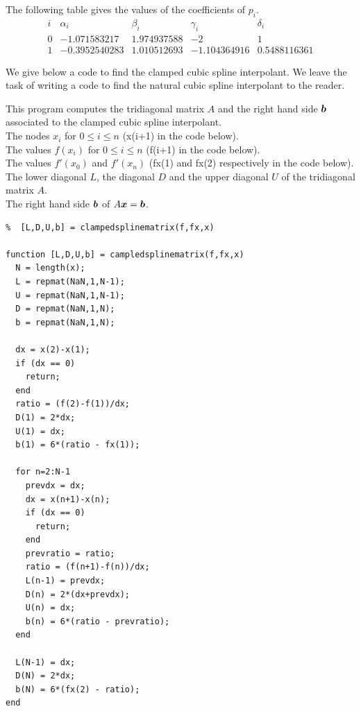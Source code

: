 \begin{egg}
The following table gives the values of the coefficients of
$p_i$.
\[
\begin{array}{c|cccc}
i & \alpha_i & \beta_i & \gamma_i & \delta_i \\
\hline
0 & -1.071583217 & 1.974937588 & -2 & 1 \\
1 & -0.3952540283 & 1.010512693 & -1.104364916 & 0.5488116361
\end{array}
\]
\label{egg_clamped}
\end{egg}

We give below a code to find the clamped cubic spline interpolant.
We leave the task of writing a code to find the natural cubic spline
interpolant to the reader.

\begin{code} \label{codeCCSI}
This program computes the tridiagonal matrix $A$ and the right hand
side $\bm{b}$ associated to the clamped cubic spline interpolant.\\
 The nodes $x_i$ for $0 \leq i \leq n$ (x(i+1) in the code
below).\\
The values $f(x_i)$ for $0 \leq i \leq n$ (f(i+1) in the code
below).\\
The values $f'(x_0)$ and $f'(x_n)$ (fx(1) and fx(2) respectively
in the code below).\\
 The lower diagonal $L$, the diagonal $D$ and the upper
diagonal $U$ of the tridiagonal matrix $A$.\\
The right hand side $\bm{b}$ of $A\bm{x} = \bm{b}$.
\small
\begin{verbatim}
%  [L,D,U,b] = clampedsplinematrix(f,fx,x)

function [L,D,U,b] = campledsplinematrix(f,fx,x)
  N = length(x);
  L = repmat(NaN,1,N-1);
  U = repmat(NaN,1,N-1);
  D = repmat(NaN,1,N);
  b = repmat(NaN,1,N);

  dx = x(2)-x(1);
  if (dx == 0)
    return;
  end
  ratio = (f(2)-f(1))/dx;
  D(1) = 2*dx;
  U(1) = dx;
  b(1) = 6*(ratio - fx(1));

  for n=2:N-1
    prevdx = dx;
    dx = x(n+1)-x(n);
    if (dx == 0)
      return;
    end
    prevratio = ratio;
    ratio = (f(n+1)-f(n))/dx;
    L(n-1) = prevdx;
    D(n) = 2*(dx+prevdx);
    U(n) = dx;
    b(n) = 6*(ratio - prevratio);
  end

  L(N-1) = dx;
  D(N) = 2*dx;
  b(N) = 6*(fx(2) - ratio);
end
\end{verbatim}
\end{code}

